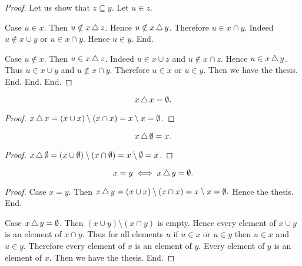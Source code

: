 \documentclass[../../sets-and-functions.ftl.tex]{subfiles}
\begin{document}
\begin{forthel}
\begin{proof}
        Let us show that $z \subseteq y$.
          Let $u \in z$.

          Case $u \in x$.
            Then $u \notin x \mathop{\triangle} z$.
            Hence $u \notin x \mathop{\triangle} y$.
            Therefore $u \in x \cap y$.
            Indeed $u \notin x \cup y$ or $u \in x \cap y$.
            Hence $u \in y$.
          End.

          Case $u \notin x$.
            Then $u \in x \mathop{\triangle} z$.
            Indeed $u \in x \cup z$ and $u \notin x \cap z$.
            Hence $u \in x \mathop{\triangle} y$.
            Thus $u \in x \cup y$ and $u \notin x \cap y$.
            Therefore $u \in x$ or $u \in y$.
            Then we have the thesis.
          End.
        End.
      End.
    \end{proof}


    \begin{proposition}[SF 01 04 496712]
      \[ x \mathop{\triangle} x = \emptyset. \]
    \end{proposition}
    \begin{proof}
      $x \mathop{\triangle} x
      = (x \cup x) \setminus (x \cap x)
      = x \setminus x
      = \emptyset$.
    \end{proof}


    \begin{proposition}[SF 01 04 182395]
      \[ x \mathop{\triangle} \emptyset = x. \]
    \end{proposition}
    \begin{proof}
      $x \mathop{\triangle} \emptyset
      = (x \cup \emptyset) \setminus (x \cap \emptyset)
      = x \setminus \emptyset = x$.
    \end{proof}


    \begin{proposition}[SF 01 04 814558]
      \[ x = y \iff x \mathop{\triangle} y = \emptyset. \]
    \end{proposition}
    \begin{proof}
      Case $x = y$.
        Then $x \mathop{\triangle} y = (x \cup x) \setminus (x \cap x) = x \setminus x =
        \emptyset.$
        Hence the thesis.
      End.

      Case $x \mathop{\triangle} y = \emptyset$.
        Then $(x \cup y) \setminus (x \cap y)$ is empty.
        Hence every element of $x \cup y$ is an element of $x \cap y$.
        Thus for all elements $u$ if $u \in x$ or $u \in y$ then $u \in x$ and
        $u \in y$.
        Therefore every element of $x$ is an element of $y$.
        Every element of $y$ is an element of $x$.
        Then we have the thesis.
      End.
    \end{proof}
  \end{forthel}
\end{document}
